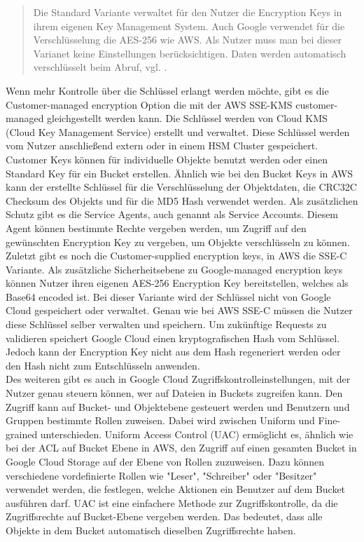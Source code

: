 \begin{quote}
	Die Standard Variante verwaltet für den Nutzer die Encryption Keys in ihrem eigenen Key Management System. Auch Google verwendet für die Verschlüsselung die AES-256 wie AWS. Als Nutzer muss man bei dieser Varianet keine Einstellungen berücksichtigen. Daten werden automatisch verschlüsselt beim Abruf, vgl. \cite{gcp-encrypt}.
\end{quote}

Wenn mehr Kontrolle über die Schlüssel erlangt werden möchte, gibt es die Customer-managed encryption Option die mit der AWS SSE-KMS customer-managed gleichgestellt werden kann. Die Schlüssel werden von Cloud KMS (Cloud Key Management Service) erstellt und verwaltet. Diese Schlüssel werden vom Nutzer anschließend extern oder in einem HSM Cluster gespeichert. Customer Keys können für individuelle Objekte benutzt werden oder einen Standard Key für ein Bucket erstellen. Ähnlich wie bei den Bucket Keys in AWS kann der erstellte Schlüssel für die Verschlüsselung der Objektdaten, die CRC32C Checksum des Objekts und für die MD5 Hash verwendet werden. Als zusätzlichen Schutz gibt es die Service Agents, auch genannt als Service Accounts. Diesem Agent können bestimmte Rechte vergeben werden, um Zugriff auf den gewünschten Encryption Key zu vergeben, um Objekte verschlüsseln zu können.\\

Zuletzt gibt es noch die Customer-supplied encryption keys, in AWS die SSE-C Variante. Als zusätzliche Sicherheitsebene zu Google-managed encryption keys können Nutzer ihren eigenen AES-256 Encryption Key bereitstellen, welches als Base64 encoded ist. Bei dieser Variante wird der Schlüssel nicht von Google Cloud gespeichert oder verwaltet. Genau wie bei AWS SSE-C müssen die Nutzer diese Schlüssel selber verwalten und speichern. Um zukünftige Requests zu validieren speichert Google Cloud einen kryptografischen Hash vom Schlüssel. Jedoch kann der Encryption Key nicht aus dem Hash regeneriert werden oder den Hash nicht zum Entschlüsseln anwenden.\\

Des weiteren gibt es auch in Google Cloud Zugriffskontrolleinstellungen, mit der Nutzer genau steuern können, wer auf Dateien in Buckets zugreifen kann. Den Zugriff kann auf Bucket- und Objektebene gesteuert werden und Benutzern und Gruppen bestimmte Rollen zuweisen. Dabei wird zwischen Uniform und Fine-grained unterschieden. Uniform Access Control (UAC) ermöglicht es, ähnlich wie bei der ACL auf Bucket Ebene in AWS, den Zugriff auf einen gesamten Bucket in Google Cloud Storage auf der Ebene von Rollen zuzuweisen. Dazu können verschiedene vordefinierte Rollen wie "Leser", "Schreiber" oder "Besitzer" verwendet werden, die festlegen, welche Aktionen ein Benutzer auf dem Bucket ausführen darf. UAC ist eine einfachere Methode zur Zugriffskontrolle, da die Zugriffsrechte auf Bucket-Ebene vergeben werden. Das bedeutet, dass alle Objekte in dem Bucket automatisch dieselben Zugriffsrechte haben.\\

